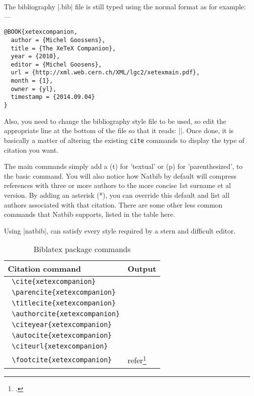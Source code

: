 \begin{refsection}
The bibliography |.bib| file is still typed using the normal format as for example:---

\begin{verbatim}
@BOOK{xetexcompanion,
  author = {Michel Goossens},
  title = {The XeTeX Companion},
  year = {2010},
  editor = {Michel Goosens},
  url = {http://xml.web.cern.ch/XML/lgc2/xetexmain.pdf},
  month = {1},
  owner = {yl},
  timestamp = {2014.09.04}
}

\end{verbatim}



Also, you need to change the bibliography style file to be used, so edit the appropriate line at the bottom of the file so that it reads: ||. Once done, it is basically a matter of altering the existing \texttt{cite} commands to display the type of citation you want.


The main commands simply add a (t)  for 'textual' or (p) for 'parenthesized', to the basic  command. You will also notice how Natbib by default will compress references with three or more authors to the more concise 1st surname et al version. By adding an asterisk (*), you can override this default and list all authors associated with that citation. There are some other less common commands that Natbib supports, listed in the table here.

Using |natbib|, can satisfy every style required by a stern and difficult editor.


\begin{longtable}{lp{8cm}}
\caption{Biblatex package commands}\\
\toprule
Citation command	&Output\\
\midrule
\verb+ \cite{xetexcompanion}+	&\cite{xetexcompanion}\\
\verb+ \parencite{xetexcompanion}+	&\parencite{xetexcompanion}\\
\verb+ \titlecite{xetexcompanion}+	&\citetitle{xetexcompanion}\\
\verb+ \authorcite{xetexcompanion}+	&\citeauthor{xetexcompanion}\\
\verb+ \citeyear{xetexcompanion}+	&\citeyear{xetexcompanion} \\
\verb+ \autocite{xetexcompanion}+	&\autocite{xetexcompanion}\\
\verb+ \citeurl{xetexcompanion}+	&\citeurl{xetexcompanion}\\
\verb+ \footcite{xetexcompanion}+	&refer\footcite[p. 22]{xetexcompanion}\\
\bottomrule
\end{longtable}


\end{refsection}
